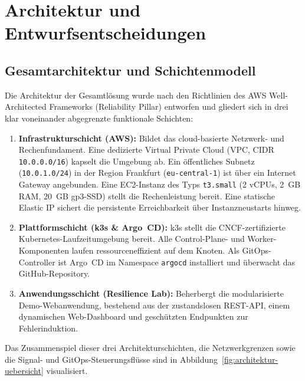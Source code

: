 \chapter{Architektur und Entwurfsentscheidungen}
\label{chap:architektur-entwurf}

\section{Gesamtarchitektur und Schichtenmodell}
\label{sec:systemarchitektur-ueberblick}
Die Architektur der Gesamtlösung wurde nach den Richtlinien des AWS Well-Architected Frameworks (Reliability Pillar) entworfen und gliedert sich in drei klar voneinander abgegrenzte funktionale Schichten:
\begin{enumerate}[noitemsep,topsep=2pt]
    \item \textbf{Infrastrukturschicht (AWS):} Bildet das cloud-basierte Netzwerk- und Rechenfundament. Eine dedizierte Virtual Private Cloud (VPC, CIDR \texttt{10.0.0.0/16}) kapselt die Umgebung ab. Ein öffentliches Subnetz (\texttt{10.0.1.0/24}) in der Region Frankfurt (\texttt{eu-central-1}) ist über ein Internet Gateway angebunden. Eine EC2-Instanz des Typs \texttt{t3.small} (2 vCPUs, 2~GB RAM, 20~GB gp3-SSD) stellt die Rechenleistung bereit. Eine statische Elastic IP sichert die persistente Erreichbarkeit über Instanzneustarts hinweg.
    \item \textbf{Plattformschicht (k3s \& Argo~CD):} k3s stellt die CNCF-zertifizierte Kubernetes-Laufzeitumgebung bereit. Alle Control-Plane- und Worker-Komponenten laufen ressourceneffizient auf dem Knoten. Als GitOps-Controller ist Argo~CD im Namespace \texttt{argocd} installiert und überwacht das GitHub-Repository.
    \item \textbf{An\-wen\-dungs\-schicht (Resilience Lab):} Beherbergt die modularisierte Demo-Webanwendung, bestehend aus der zustandslosen REST-API, einem dynamischen Web-Dashboard und geschützten Endpunkten zur Fehlerinduktion.
\end{enumerate}

Das Zusammenspiel dieser drei Architekturschichten, die Netzwerkgrenzen sowie die Signal- und GitOps-Steuerungsflüsse sind in Abbildung~\ref{fig:architektur-uebersicht} visualisiert.




